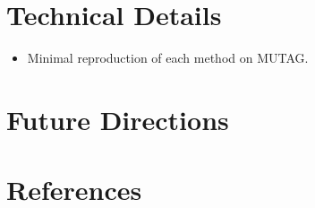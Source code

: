 \documentclass[
  11pt,
  letterpaper,
]{article}
\providecommand{\tightlist}{%
  \setlength{\itemsep}{0pt}\setlength{\parskip}{0pt}}\usepackage{longtable,booktabs,array}
\begin{document}
\hypertarget{technical-details}{%
\section{Technical Details}\label{technical-details}}

\begin{itemize}
\tightlist
\item
  Minimal reproduction of each method on MUTAG.
\end{itemize}

\hypertarget{future-directions}{%
\section{Future Directions}\label{future-directions}}

\pagebreak

\hypertarget{references}{%
\section*{References}\label{references}}
\end{document}
